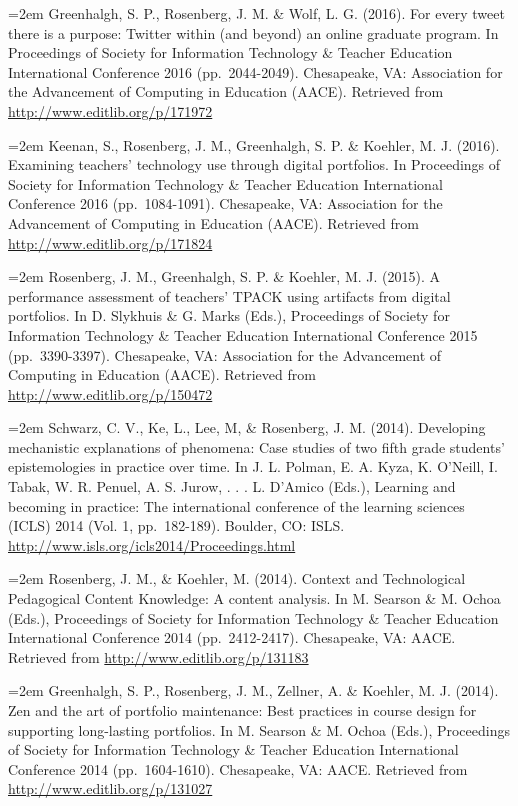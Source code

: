 \documentclass[]{article}
\begin{document}
\hangindent=2em Greenhalgh, S. P., Rosenberg, J. M. \& Wolf, L. G.
(2016). For every tweet there is a purpose: Twitter within (and beyond)
an online graduate program. In Proceedings of Society for Information
Technology \& Teacher Education International Conference 2016
(pp.~2044-2049). Chesapeake, VA: Association for the Advancement of
Computing in Education (AACE). Retrieved from
\url{http://www.editlib.org/p/171972}

\hangindent=2em Keenan, S., Rosenberg, J. M., Greenhalgh, S. P. \&
Koehler, M. J. (2016). Examining teachers' technology use through
digital portfolios. In Proceedings of Society for Information Technology
\& Teacher Education International Conference 2016 (pp.~1084-1091).
Chesapeake, VA: Association for the Advancement of Computing in
Education (AACE). Retrieved from \url{http://www.editlib.org/p/171824}

\hangindent=2em Rosenberg, J. M., Greenhalgh, S. P. \& Koehler, M. J.
(2015). A performance assessment of teachers' TPACK using artifacts from
digital portfolios. In D. Slykhuis \& G. Marks (Eds.), Proceedings of
Society for Information Technology \& Teacher Education International
Conference 2015 (pp.~3390-3397). Chesapeake, VA: Association for the
Advancement of Computing in Education (AACE). Retrieved from
\url{http://www.editlib.org/p/150472}

\hangindent=2em Schwarz, C. V., Ke, L., Lee, M, \& Rosenberg, J. M.
(2014). Developing mechanistic explanations of phenomena: Case studies
of two fifth grade students' epistemologies in practice over time. In J.
L. Polman, E. A. Kyza, K. O'Neill, I. Tabak, W. R. Penuel, A. S. Jurow,
. . . L. D'Amico (Eds.), Learning and becoming in practice: The
international conference of the learning sciences (ICLS) 2014 (Vol. 1,
pp.~182-189). Boulder, CO: ISLS.
\url{http://www.isls.org/icls2014/Proceedings.html}

\hangindent=2em Rosenberg, J. M., \& Koehler, M. (2014). Context and
Technological Pedagogical Content Knowledge: A content analysis. In M.
Searson \& M. Ochoa (Eds.), Proceedings of Society for Information
Technology \& Teacher Education International Conference 2014
(pp.~2412-2417). Chesapeake, VA: AACE. Retrieved from
\url{http://www.editlib.org/p/131183}

\hangindent=2em Greenhalgh, S. P., Rosenberg, J. M., Zellner, A. \&
Koehler, M. J. (2014). Zen and the art of portfolio maintenance: Best
practices in course design for supporting long-lasting portfolios. In M.
Searson \& M. Ochoa (Eds.), Proceedings of Society for Information
Technology \& Teacher Education International Conference 2014
(pp.~1604-1610). Chesapeake, VA: AACE. Retrieved from
\url{http://www.editlib.org/p/131027}
\end{document}
